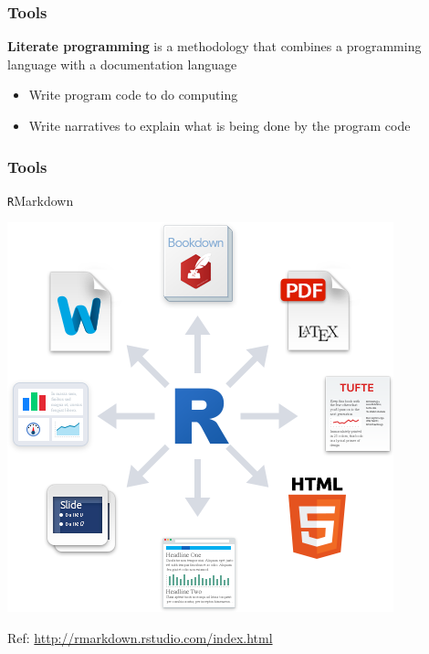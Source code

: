 \documentclass{beamer}
\begin{document}
\begin{frame}
\frametitle{Tools}
{\bf Literate programming} is a methodology that combines a programming language with a documentation language\\ 
\begin{itemize}
    \item Write program code to do computing
    \item Write narratives to explain what is being done by the program code
\end{itemize}
\end{frame}


\begin{frame}
\frametitle{Tools}
\begin{center}\Large\texttt{R}Markdown\end{center}
\begin{center}\includegraphics[scale=0.35]{figures/RMarkdownOutputFormats.png}\end{center}
\begin{center}\tiny Ref: {\url{http://rmarkdown.rstudio.com/index.html}}\end{center}
\end{frame}
\end{document}
